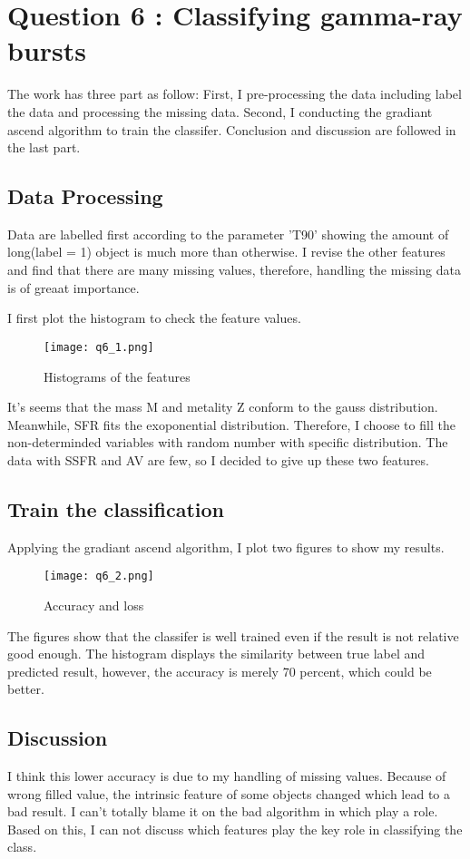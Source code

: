 \section{Question 6 : Classifying gamma-ray bursts}
The work has three part as follow: First, I pre-processing the data including label the data and processing the missing data. Second, I conducting the gradiant ascend algorithm to train the classifer. Conclusion and discussion are followed in the last part.
\subsection{Data Processing}
Data are labelled first according to the parameter 'T90' showing the amount of long(label = 1) object is much more than otherwise. I revise the other features and find that there are many missing values, therefore, handling the missing data is of greaat importance.

I first plot the histogram to check the feature values.

\begin{figure}[h!]
  \centering
  \texttt{[image: q6\_1.png]}
  \caption{Histograms of the features}
  \label{fig:hist_feature}
\end{figure}

It's seems that the mass M and metality Z conform to the gauss distribution. Meanwhile, SFR fits the exoponential distribution. Therefore, I choose to fill the non-determinded variables with random number with specific distribution. The data with SSFR and AV are few, so I decided to give up these two features.


\subsection{Train the classification}
Applying the gradiant ascend algorithm, I plot two figures to show my results.

\begin{figure}[h!]
  \centering
  \texttt{[image: q6\_2.png]}
  \caption{Accuracy and loss}
  \label{fig:hist_feature}
\end{figure}
The figures show that the classifer is well trained even if the result is not relative good enough. The histogram displays the similarity between true label and predicted result, however, the accuracy is merely 70 percent, which could be better.

\subsection{Discussion}
I think this lower accuracy is due to my handling of missing values. Because of wrong filled value, the intrinsic feature of some objects changed which lead to a bad result. I can't totally blame it on the bad algorithm in which play a role. Based on this, I can not discuss which features play the key role in classifying the class.

